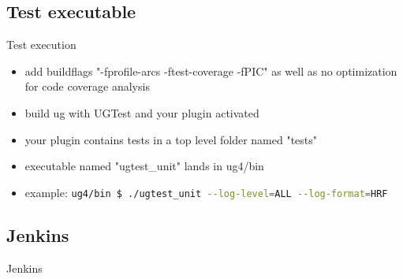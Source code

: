 \documentclass{beamer}
\newcommand{\subsectiontitle}[1]{
    \subsection{#1}
    \begin{frame}
        \LARGE{#1}
    \end{frame}
}
\begin{document}
        \subsection{Test executable}
        \begin{frame}{Test execution}
            \begin{itemize}
                \item add buildflags "-fprofile-arcs -ftest-coverage -fPIC" as well as no optimization for code coverage analysis
                \item build ug with UGTest and your plugin activated
                \item your plugin contains tests in a top level folder named "tests"
                \item executable named "ugtest\_unit" lands in ug4/bin
                \item example: \lstinline[language=bash]{ug4/bin $ ./ugtest_unit --log-level=ALL --log-format=HRF}
            \end{itemize}
        \end{frame}
        
        \subsectiontitle{Jenkins}
\end{document}
